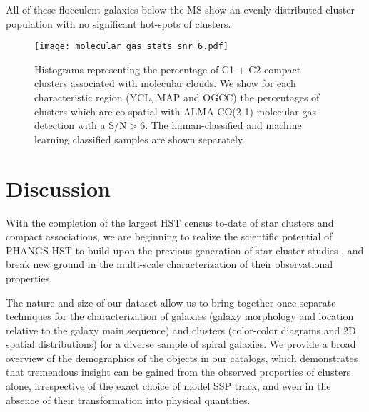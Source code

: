 \documentclass[linenumbers]{aastex63}
\begin{document}
All of these flocculent galaxies below the MS show an evenly distributed cluster population with no significant hot-spots of clusters. 
























\begin{figure} 
\texttt{[image: molecular\_gas\_stats\_snr\_6.pdf]}
\caption{Histograms representing the percentage of C1 + C2 compact clusters associated with molecular clouds. We show for each characteristic region (YCL, MAP and OGCC) the percentages of clusters which are co-spatial with ALMA CO(2-1) molecular gas detection with a S/N$>6$. The human-classified and machine learning classified samples are shown separately.}
 \label{fig:dist_gmc}
\end{figure}
\section{Discussion}\label{sect:discussion}

With the completion of the largest HST census to-date of star clusters and compact associations, we are beginning to realize the scientific potential of PHANGS-HST to {build upon the previous generation of star cluster studies \citep[e.g.,][and references therein]{portegies_zwart_young_2010, renaud_star_2018, krumholz_star_2019, adamo20}}, and break new ground in the multi-scale characterization of their observational properties.  

The nature and size of our dataset allow us to bring together once-separate techniques for the characterization of galaxies (galaxy morphology and location relative to the galaxy main sequence) and clusters (color-color diagrams and 2D spatial distributions) for a diverse sample of spiral galaxies.  We provide a broad overview of the demographics of the objects in our catalogs, which demonstrates that tremendous insight can be gained from the observed properties of clusters alone, {irrespective of the exact choice of model SSP track,} and even in the absence of their transformation into physical quantities.  
\end{document}
